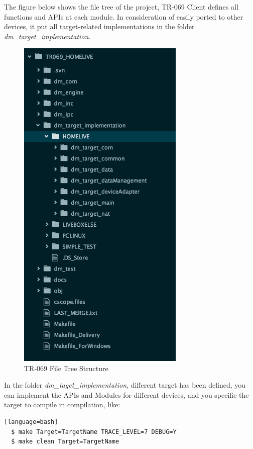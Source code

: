 The figure below shows the file tree of the project, TR-069 Client defines all functions and APIs at each module. In consideration of easily ported to other devices, it put all target-related implementations in the folder \textit{dm\_target\_implementation}.

\begin{figure}[htbp]
	\centering
		\includegraphics[width=8cm]{Figures/tr069_files.png}
	\caption[TR-069 File Tree Structure]{TR-069 File Tree Structure}
	\label{fig:tr069file}
\end{figure}

In the folder \textit{dm_taget_implementation}, different target has been defined, you can implement the APIs and Modules for different devices, and you specifie the target to compile in compilation, like:

\begin{lstlisting}[style=DOS][language=bash]
  $ make Target=TargetName TRACE_LEVEL=7 DEBUG=Y
  $ make clean Target=TargetName
\end{lstlisting}

